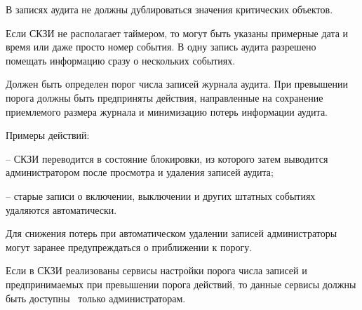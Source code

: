 В записях аудита не должны дублироваться значения критических объектов.

\begin{note*}
Если СКЗИ не располагает таймером, то могут быть указаны примерные 
дата и время или даже просто номер события.
%
В одну запись аудита разрешено помещать информацию сразу о нескольких событиях. 
\end{note*}


\label{R.AU.Over} %
Должен быть определен порог числа записей журнала аудита.
При превышении порога должны быть предприняты действия,
направленные на сохранение приемлемого размера журнала
и минимизацию потерь информации аудита.

\begin{note*}
Примеры действий:

-- СКЗИ переводится в состояние блокировки, из которого затем выводится
администратором после просмотра и удаления записей аудита;

-- старые записи о включении, выключении и других штатных событиях удаляются 
автоматически. 

Для снижения потерь при автоматическом удалении записей 
администраторы могут заранее предупреждаться о приближении к порогу.
\end{note*}

\label{R.AU.Settings} %
Если в СКЗИ реализованы сервисы настройки порога числа записей и 
предпринимаемых при превышении порога действий, то данные сервисы должны 
быть доступны~ только администраторам. 

